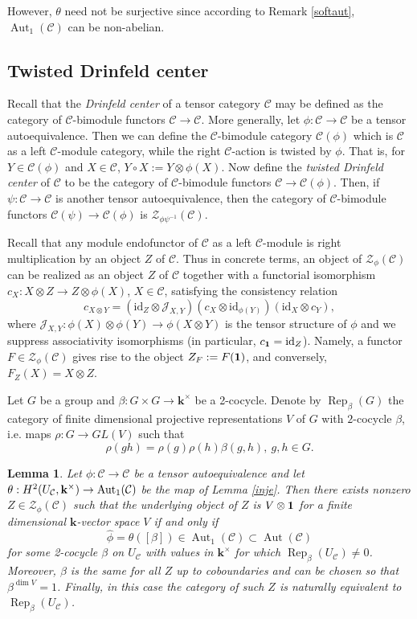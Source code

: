 \documentclass[12pt]{amsart}
\numberwithin{equation}{section}
\newtheorem{lemma}[theorem]{Lemma}
\theoremstyle{definition}
\newcommand{\id}{\text{id}}
\newcommand{\Aut}{\text{Aut}}
\newcommand{\Rep}{\text{Rep}}
\newcommand{\1}{_{(1)}}
\newcommand{\2}{_{(2)}}
\newcommand{\3}{_{(3)}}
\newcommand{\4}{_{(4)}}
\newcommand{\5}{_{(5)}}
\newcommand{\6}{_{(6)}}
\newcommand{\C}{\mathcal{C}}
\theoremstyle{plain}
\theoremstyle{definition}
\theoremstyle{remark}
\def\C{\mathcal{C}}
\def\Aut{\mathop{\mathrm{Aut}}\nolimits}
\def\Z{\mathcal{Z}}
\def\k{\mathbf{k}}
\def\Rep{\mathop{\mathrm{Rep}}\nolimits}
\begin{document}
However, $\theta$ need not be surjective since according to Remark \ref{softaut}, $\Aut_1(\C)$ can be non-abelian. 

\subsection{Twisted Drinfeld center} 

Recall that the {\it Drinfeld center} of a tensor category $\C$ may be defined as 
the category of $\C$-bimodule functors $\C\to \C$. More generally, 
let $\phi: \C\to \C$ be a tensor autoequivalence. Then 
we can define the $\C$-bimodule category $\C(\phi)$ 
which is $\C$ as a left $\C$-module category, while the right $\C$-action is twisted by $\phi$. That is,  
for $Y\in \C(\phi)$ and $X\in \C$, $Y\circ X:=Y\otimes \phi(X)$. 
Now define the {\it twisted Drinfeld center} of $\C$ to be the
category of $\C$-bimodule functors $\C\to \C(\phi)$. Then, if $\psi: \C\to \C$ 
is another tensor autoequivalence, then the
category of $\C$-bimodule functors $\C(\psi)\to \C(\phi)$ is $\Z_{\phi\psi^{-1}}(\C)$. 

Recall that any module endofunctor of $\C$ as a left $\C$-module is right multiplication 
by an object $Z$ of $\C$. Thus in concrete terms, an object 
of $\Z_\phi(\C)$ can be realized as an object $Z$ of $\C$ together with a functorial isomorphism 
$c_X: X\otimes Z\to Z\otimes \phi(X)$, $X\in \C$, satisfying the consistency relation
\begin{equation}\label{conrel}
c_{X\otimes Y}=(\id_Z\otimes \mathcal J_{X,Y})(c_X\otimes\id_{\phi(Y)})(\id_X\otimes c_Y),
\end{equation}
where $\mathcal J_{X,Y}:\phi(X)\otimes\phi(Y)\to \phi(X\otimes Y)$ is the tensor structure of $\phi$ and we suppress associativity isomorphisms (in particular, $c_{\bold 1}=\id_Z$). Namely, a functor $F\in \Z_\phi(\C)$ gives rise to the object $Z_F:= F(\bold 1)$, and conversely, $F_Z(X)=X\otimes Z$.

Let $G$ be a group and $\beta: G\times G\to \k^\times$ be a 2-cocycle. Denote by 
$\Rep_\beta(G)$ the category of finite dimensional projective representations $V$
of $G$ with $2$-cocycle $\beta$, i.e. maps $\rho: G\to GL(V)$ 
such that 
$$
\rho(gh)=\rho(g)\rho(h)\beta(g,h),\ g,h\in G.
$$ 

\begin{lemma}\label{twistedcenter} Let $\phi:\C\to \C$ be a tensor autoequivalence and let \linebreak $\theta: H^2(U_\C,\k^\times)\to {\rm Aut}_1(\C)$ be the map of Lemma \ref{inje}. 
Then there exists nonzero $Z\in \Z_\phi(\C)$ such that the underlying object of $Z$ is $V\otimes \bold 1$ for a finite dimensional $\k$-vector space $V$ if and only if 
$$
\widehat{\phi}=\theta([\beta])\in \Aut_1(\C)\subset \Aut(\C)
$$ 
for some 2-cocycle $\beta$ on $U_\C$ with values in $\k^\times$ for which $\Rep_\beta(U_\C)\ne 0$. Moreover, $\beta$ is the same for all $Z$ up to coboundaries and can be chosen so that $\beta^{\dim V}=1$. Finally, in this case the category of such $Z$ is naturally equivalent to 
$\Rep_\beta(U_\C)$.
\end{lemma}
\end{document}
